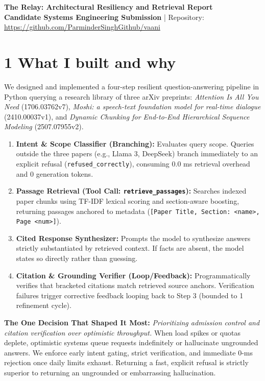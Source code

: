 \documentclass[9pt,a4paper]{article}
\begin{document}
\begin{center}
    {\LARGE \textbf{The Relay: Architectural Resiliency and Retrieval Report}}\\[2pt]
    \textbf{Candidate Systems Engineering Submission} \quad | \quad Repository: \url{https://github.com/ParminderSinghGithub/vaani}
\end{center}

\vspace{-4pt}

\section*{1 What I built and why}
We designed and implemented a four-step resilient question-answering pipeline in Python querying a research library of three arXiv preprints: \textit{Attention Is All You Need} (1706.03762v7), \textit{Moshi: a speech-text foundation model for real-time dialogue} (2410.00037v1), and \textit{Dynamic Chunking for End-to-End Hierarchical Sequence Modeling} (2507.07955v2).
\begin{enumerate}
    \item \textbf{Intent \& Scope Classifier (Branching):} Evaluates query scope. Queries outside the three papers (e.g., Llama 3, DeepSeek) branch immediately to an explicit refusal (\texttt{refused\_correctly}), consuming 0.0 ms retrieval overhead and 0 generation tokens.
    \item \textbf{Passage Retrieval (Tool Call: \texttt{retrieve\_passages}):} Searches indexed paper chunks using TF-IDF lexical scoring and section-aware boosting, returning passages anchored to metadata (\texttt{[Paper Title, Section: <name>, Page <num>]}).
    \item \textbf{Cited Response Synthesizer:} Prompts the model to synthesize answers strictly substantiated by retrieved context. If facts are absent, the model states so directly rather than guessing.
    \item \textbf{Citation \& Grounding Verifier (Loop/Feedback):} Programmatically verifies that bracketed citations match retrieved source anchors. Verification failures trigger corrective feedback looping back to Step 3 (bounded to 1 refinement cycle).
\end{enumerate}
\textbf{The One Decision That Shaped It Most:} \textit{Prioritizing admission control and citation verification over optimistic throughput.} When load spikes or quotas deplete, optimistic systems queue requests indefinitely or hallucinate ungrounded answers. We enforce early intent gating, strict verification, and immediate 0-ms rejection once daily limits exhaust. Returning a fast, explicit refusal is strictly superior to returning an ungrounded or embarrassing hallucination.
\end{document}
